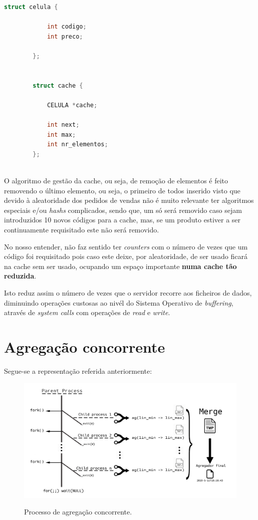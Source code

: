 \documentclass[a4paper,11pt]{report}
\begin{document}
\begin{lstlisting}[language=C]
        struct celula {
        
        	int codigo;
        	int preco;
        
        };
      
        
        struct cache {
        
        	CELULA *cache;
        
        	int next;
        	int max;
        	int nr_elementos;
        };
        
\end{lstlisting}


O algoritmo de gestão da cache, ou seja, de remoção de elementos é feito removendo o último elemento, ou seja, o primeiro de todos inserido visto que devido à aleatoridade dos pedidos de vendas não é muito relevante ter algoritmos especiais e/ou \textit{hashs} complicados, sendo que, um só será removido caso sejam introduzidos 10 novos códigos para a cache, mas, se um produto estiver a ser continuamente requisitado este não será removido. \par 

No nosso entender, não faz sentido ter \textit{counters} com o número de vezes que um código foi requisitado pois caso este deixe, por aleatoridade, de ser usado ficará na cache sem ser usado, ocupando um espaço importante \textbf{numa cache tão reduzida}.

Isto reduz assim o número de vezes que o servidor recorre aos ficheiros de dados, diminuindo operações custosas ao nivél do Sistema Operativo de \textit{buffering}, através de \textit{system calls} com operações de \textit{read} e \textit{write}.

\section{Agregação concorrente}

    Segue-se a representação referida anteriormente:

\begin{figure}[H]
    \centering
    \includegraphics[scale=0.5]{agconc.png}
    \label{img:htag}
    \caption{Processo de agregação concorrente.}
\end{figure}
\end{document}
